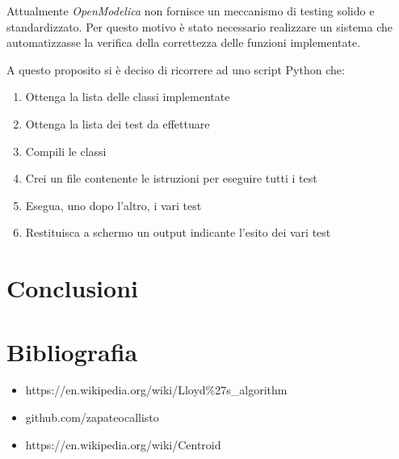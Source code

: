 \documentclass[11pt,a4paper]{report}
\begin{document}
Attualmente \textit{OpenModelica} non fornisce un meccanismo di testing solido e standardizzato. Per questo motivo è stato necessario realizzare un sistema che automatizzasse la verifica della correttezza delle funzioni implementate.

A questo proposito si è deciso di ricorrere ad uno script Python che:

\begin{enumerate}
	\item Ottenga la lista delle classi implementate
	\item Ottenga la lista dei test da effettuare
	\item Compili le classi
	\item Crei un file contenente le istruzioni per eseguire tutti i test
	\item Esegua, uno dopo l'altro, i vari test
	\item Restituisca a schermo un output indicante l'esito dei vari test
\end{enumerate}



\pagebreak

\chapter{Conclusioni}

\chapter*{Bibliografia}

\begin{itemize}
	\item https://en.wikipedia.org/wiki/Lloyd\%27s\_algorithm
	\item github.com/zapateocallisto
	\item https://en.wikipedia.org/wiki/Centroid
\end{itemize}
\end{document}
